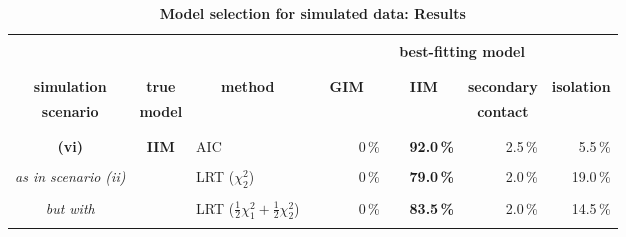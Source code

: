 \documentclass[11pt]{article}
\begin{document}
\begin{table}[!b]
\caption{\bf \\Model selection for simulated data: Results}
\label{modelresults: additional}
\vspace*{-3mm}
\begin{center}
\hspace*{-1.65cm}
{\small \begin{tabular}{|c|c|l|rrrr|} \hline 
\vspace*{-2mm} & & & & & &  \\
 &  &  & \multicolumn{4}{c|}{\bf best-fitting model} \\  
\vspace*{-2mm} & & & & & &  \\
\cline{4-7} 
\vspace*{-2mm} & & & & & &  \\
{\bf simulation} & {\bf true}    & \multicolumn{1}{c|}{\bf method} & \multicolumn{1}{c}{\bf ~~GIM~~} & \multicolumn{1}{c}{\bf ~~IIM~~} & \multicolumn{1}{c}{\bf secondary} & \multicolumn{1}{c|}{\bf isolation} \\
{\bf scenario}    & {\bf model} &                                             &                                        &                                      & \multicolumn{1}{c}{\bf contact}     &                                               \\ 
\vspace*{-2mm} & & & & & &  \\
\hline 
\vspace*{-2mm} & & & & & &  \\
 {\bf (vi)}  & {\bf IIM} & AIC                                                                                                              & 0\,\% & {\bf 92.0\,\%} & 2.5\,\% & 5.5\,\% \\
\vspace*{-3mm} & & & & & &  \\
    {\em as in scenario (ii)}  &                & LRT ($\chi^2_2$)                                                                                      & 0\,\% & {\bf 79.0\,\%} & 2.0\,\% & 19.0\,\% \\
\vspace*{-3mm} & & & & & &  \\
    {\em but with}  &                & LRT ($\frac{1}{2} \chi^2_1 +\frac{1}{2} \chi^2_2$)            & 0\,\% & {\bf 83.5\,\%} & 2.0\,\% & 14.5\,\% \\
\vspace*{-3mm} & & & & & &  \\

\end{tabular}}
\end{center}
\end{table}
\end{document}
